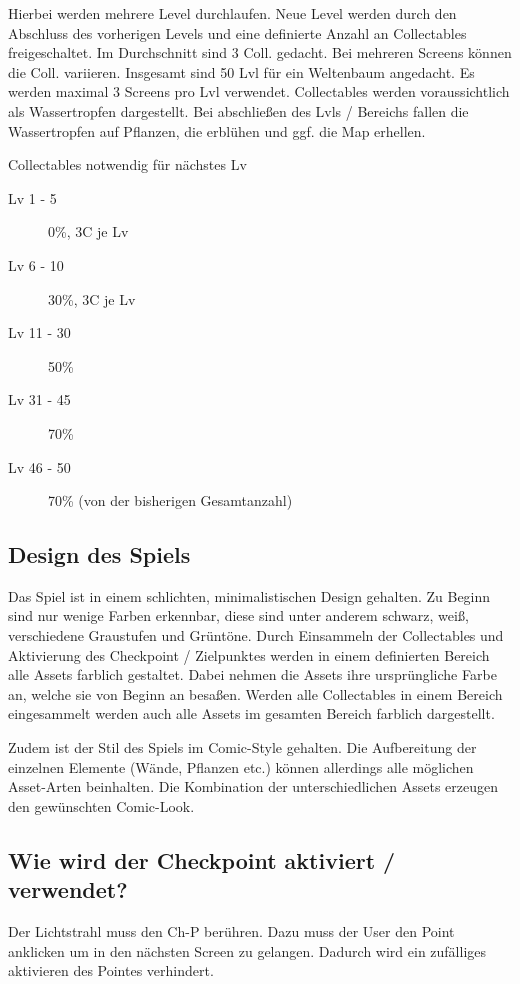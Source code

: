 Hierbei werden mehrere Level durchlaufen. Neue Level werden durch den Abschluss des vorherigen Levels und  eine definierte Anzahl an Collectables freigeschaltet. Im Durchschnitt sind 3 Coll. gedacht. Bei mehreren Screens können die Coll. variieren. Insgesamt sind 50 Lvl für ein Weltenbaum angedacht. Es werden maximal 3 Screens pro Lvl verwendet.
Collectables werden voraussichtlich als Wassertropfen dargestellt. Bei abschließen des Lvls / Bereichs fallen die Wassertropfen auf Pflanzen, die erblühen und ggf. die Map erhellen.

Collectables notwendig für nächstes Lv
\begin{description}
\item [Lv 1 - 5] 0\%, 3C je Lv 
\item [Lv 6 - 10] 30\%, 3C je Lv
\item [Lv 11 - 30] 50\%
\item [Lv 31 - 45] 70\%
\item [Lv 46 - 50] 70\%   (von der bisherigen Gesamtanzahl)
\end{description}

\subsection{Design des Spiels}
Das Spiel ist in einem schlichten, minimalistischen Design gehalten. Zu Beginn sind nur wenige Farben erkennbar, diese sind unter anderem schwarz, weiß, verschiedene Graustufen und Grüntöne. Durch Einsammeln der Collectables und Aktivierung des Checkpoint / Zielpunktes werden in einem definierten Bereich alle Assets farblich gestaltet. Dabei nehmen die Assets ihre ursprüngliche Farbe an, welche sie von Beginn an besaßen. Werden alle Collectables in einem Bereich eingesammelt werden auch alle Assets im gesamten Bereich farblich dargestellt.

Zudem ist der Stil des Spiels im Comic-Style gehalten. Die Aufbereitung der einzelnen Elemente (Wände, Pflanzen etc.) können allerdings alle möglichen Asset-Arten beinhalten. Die Kombination der unterschiedlichen Assets erzeugen den gewünschten Comic-Look.

\subsection{Wie wird der Checkpoint aktiviert / verwendet?}
Der Lichtstrahl muss den Ch-P berühren. Dazu muss der User den Point anklicken um in den nächsten Screen zu gelangen. Dadurch wird ein zufälliges aktivieren des Pointes verhindert.



